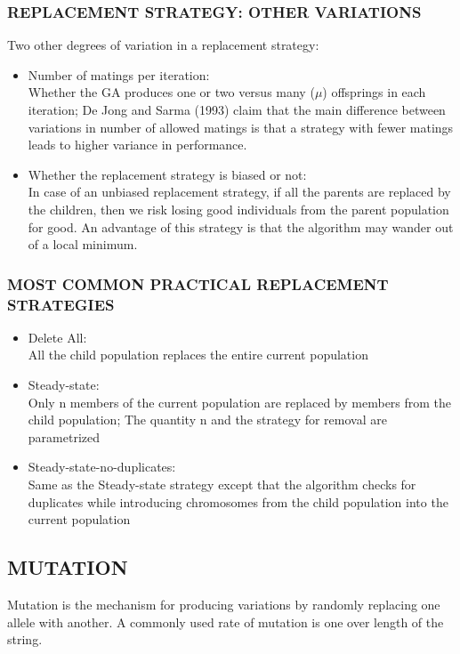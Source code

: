 \documentclass[12pt,a4paper]{article}
\begin{document}
	\subsubsection{REPLACEMENT STRATEGY: OTHER VARIATIONS}
	Two other degrees of variation in a replacement strategy:
	\begin{itemize}
	\item Number of matings per iteration: \\
	Whether the GA produces one or two versus many ($\mu$) offsprings in each iteration; De Jong and Sarma (1993) claim that the main difference between variations in number of allowed matings is that a strategy with fewer matings leads to higher variance in performance.
	\item Whether the replacement strategy is biased or not: \\
	In case of an unbiased replacement strategy, if all the parents are replaced by the children, then we risk losing good individuals from the parent population for good. An advantage of this strategy is that the algorithm may wander out of a local minimum.
	\end{itemize}
	
	\subsubsection{MOST COMMON PRACTICAL REPLACEMENT STRATEGIES}
	\cite{goldberg}
	\begin{itemize}
	\item Delete All: \\
	All the child population replaces the entire current population
	\item Steady-state: \\
	Only n members of the current population are replaced by members from the child population; The quantity n and the strategy for removal are parametrized
	\item Steady-state-no-duplicates: \\
	Same as the Steady-state strategy except that the algorithm checks for duplicates while introducing chromosomes from the child population into the current population
	\end{itemize}

	\subsection{MUTATION}
	Mutation is the mechanism for producing variations by randomly replacing one allele with another. A commonly used rate of mutation is one over length of the string.
\end{document}
